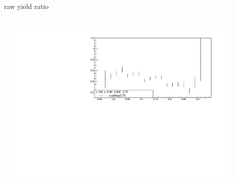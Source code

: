 \begin{frame}{raw yield ratio}
\begin{columns}
\begin{column}[T]{0.5\textwidth}
\end{column}
\begin{column}[T]{0.5\textwidth}
\includegraphics[width = 0.9\textwidth]{results/yield/statistics/x_Q2_z_0.65_5.500_0.70_ratio.pdf}
\end{column}
\end{columns}
\end{frame}
